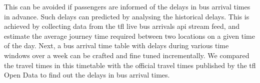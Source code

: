 \par This can be avoided if passengers are informed of the delays in bus arrival times in advance. Such delays can predicted by analysing the historical delays. This is achieved by collecting data from the \acrshort{tfl} live bus arrivals \acrfull{api} stream feed\cite{live_bus_arrivals}, and estimate the average journey time required between two locations on a given time of the day. Next, a bus arrival time table with delays during various time windows over a week can be crafted and fine tuned incrementally. We compared the travel times in this timetable with the official travel times published by the \acrshort{tfl} Open Data to find out the delays in bus arrival times.
